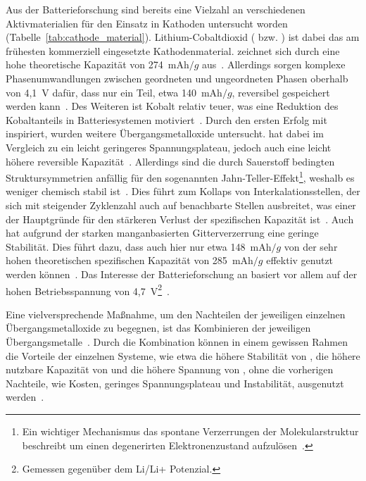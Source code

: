 Aus der Batterieforschung sind bereits eine Vielzahl an verschiedenen Aktivmaterialien für den Einsatz in Kathoden untersucht worden (Tabelle~\ref{tab:cathode_material}). Lithium-Cobaltdioxid ( bzw. ) ist dabei das am frühesten kommerziell eingesetzte Kathodenmaterial\cite{Amatucci1996}.  zeichnet sich durch eine hohe theoretische Kapazität von 274~$\si{\milli \ampere \hour \per g}$ aus~\cite{Ren2023}. Allerdings sorgen komplexe Phasenumwandlungen zwischen geordneten und ungeordneten Phasen oberhalb von 4,1~V dafür, dass nur ein Teil, etwa 140~$\si{\milli \ampere \hour \per g}$, reversibel gespeichert werden kann~\cite{Vetter2005, Liu2018}. Des Weiteren ist Kobalt relativ teuer, was eine Reduktion des Kobaltanteils in Batteriesystemen motiviert~\cite{Ren2023}.
Durch den ersten Erfolg mit  inspiriert, wurden weitere Übergangsmetalloxide untersucht.  hat dabei im Vergleich zu  ein leicht geringeres Spannungsplateau, jedoch auch eine leicht höhere reversible Kapazität~\cite{Ren2023}. Allerdings sind die durch Sauerstoff bedingten Struktursymmetrien anfällig für den sogenannten Jahn-Teller-Effekt\footnote{Ein wichtiger Mechanismus das spontane Verzerrungen der Molekularstruktur beschreibt um einen degenerirten Elektronenzustand aufzulösen~\cite{Jahn1937}.}, weshalb es weniger chemisch stabil ist~\cite{Kalyani2005}. Dies führt zum Kollaps von Interkalationsstellen, der sich mit steigender Zyklenzahl auch auf benachbarte Stellen ausbreitet, was einer der Hauptgründe für den stärkeren Verlust der spezifischen Kapazität ist~\cite{Vaelikangas2020}. Auch  hat aufgrund der starken manganbasierten Gitterverzerrung eine geringe Stabilität. Dies führt dazu, dass auch hier nur etwa 148~$\si{\milli \ampere \hour \per g}$ von der sehr hohen theoretischen spezifischen Kapazität von 285~$\si{\milli \ampere \hour \per g}$ effektiv genutzt werden können~\cite{Chen2014}. Das Interesse der Batterieforschung an  basiert vor allem auf der hohen Betriebsspannung von 4,7~V\footnote{Gemessen gegenüber dem Li/Li+ Potenzial.}~\cite{Liang2020,Yu2021,Liang2020a}.

Eine vielversprechende Maßnahme, um den Nachteilen der jeweiligen einzelnen Übergangsmetalloxide zu begegnen, ist das Kombinieren der jeweiligen Übergangsmetalle~\cite{Biasi2017}. Durch die Kombination können in einem gewissen Rahmen die Vorteile der einzelnen Systeme, wie etwa die höhere Stabilität von , die höhere nutzbare Kapazität von  und die höhere Spannung von , ohne die vorherigen Nachteile, wie Kosten, geringes Spannungsplateau und Instabilität, ausgenutzt werden~\cite{Ren2023}.
